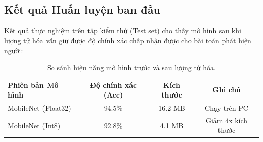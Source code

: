 
\newpage
\subsection{Kết quả Huấn luyện ban đầu}
Kết quả thực nghiệm trên tập kiểm thử (Test set) cho thấy mô hình sau khi lượng tử hóa vẫn giữ được độ chính xác chấp nhận được cho bài toán phát hiện người:

\begin{table}[!h]
\centering
\begin{tabular}{|l|c|c|c|}
\hline
\textbf{Phiên bản Mô hình} & \textbf{Độ chính xác (Acc)} & \textbf{Kích thước} & \textbf{Ghi chú} \\ \hline
MobileNet (Float32) & 94.5\% & 16.2 MB & Chạy trên PC \\ \hline
MobileNet (Int8) & 92.8\% & 4.1 MB & Giảm 4x kích thước \\ \hline
\end{tabular}
\caption{So sánh hiệu năng mô hình trước và sau lượng tử hóa.}
\label{tab:model_result}
\end{table}
